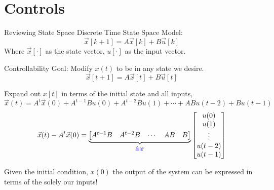 \section{Controls}

\begin{frame}{Reviewing State Space}
    Discrete Time State Space Model:
    \[
        \vec x[k+1] = A \vec x[k] + B \vec u[k]
    \]
    Where \(\vec x[\cdot]\) as the state vector, \(u[\cdot]\) as the input vector.
\end{frame}


\begin{frame}{Controllability}
    Goal: Modify \(x(t)\) to be in any state we desire.
    \[
        \vec x[t+1] = A \vec x[t] + B \vec u[t]
    \]

    Expand out \(x[t]\) in terms of the initial state and all inputs,
    \[
        \vec x(t) = A^t \vec x(0)
                + A^{t - 1} B u(0)
                + A^{t - 2} B u(1)  + \cdots
                + A B u(t - 2)
                + B u(t - 1)
    \]
    \[
        \vec x(t) - A^t \vec x(0) =
        \underbrace{\begin{bmatrix}
            A^{t - 1} B & A^{t -2} B & \cdots & AB & B
        \end{bmatrix}}_{\color{blue}\triangleq \mathscr{C}}
        \begin{bmatrix}
            u(0) \\
            u(1) \\
            \vdots \\
            u(t -2) \\
            u(t -1) \\
        \end{bmatrix}
    \]

    \pause
    Given the initial condition, \(x(0)\) the output of the system can be  expressed in terms of the solely our inputs!
\end{frame}


